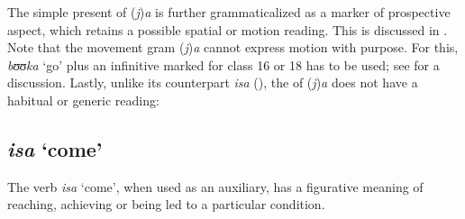 The simple present of (\textit{j})\textit{a} is further grammaticalized as a marker of prospective aspect, which retains a possible spatial or motion reading. This is discussed in . Note that the movement gram (\textit{j})\textit{a} cannot express motion with purpose. For this, \textit{bʊʊka} \lq go' plus an infinitive marked for  class 16 or 18 has to be used; see  for a discussion. Lastly, unlike its counterpart \textit{isa} (), the  of (\textit{j})\textit{a} does not have a habitual or generic reading:

\begin{exe}
\end{exe}

\subsection{\textit{isa} `come'}\label{isaAspectualizer}
The verb \textit{isa} \lq come', when used as an auxiliary, has a figurative meaning of reaching, achieving or being led to a particular condition.

